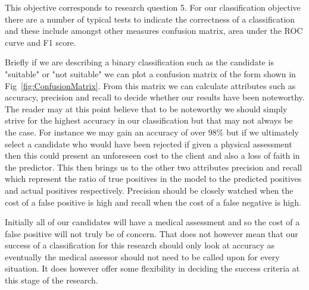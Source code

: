 This objective corresponds to research question 5. For our classification objective there are a number of typical tests to indicate the correctness of a classification and these include amongst other measures confusion matrix, area under the ROC curve and F1 score.




Briefly if we are describing a binary classification such as the candidate is "suitable" or "not suitable" we can plot a confusion matrix of the form shown in Fig~\ref{fig:ConfusionMatrix}. From this matrix we can calculate attributes such as accuracy, precision and recall to decide whether our results have been noteworthy. The reader may at this point believe that to be noteworthy we should simply strive for the highest accuracy in our classification but that may not always be the case. For instance we may gain an accuracy of over 98\% but if we ultimately select a candidate who would have been rejected if given a physical assessment then this could present an unforeseen cost to the client and also a loss of faith in the predictor. This then brings us to the other two attributes precision and recall which represent the ratio of true positives in the model to the predicted positives and actual positives respectively. Precision should be closely watched when the cost of a false positive is high and recall when the cost of a false negative is high.

Initially all of our candidates will have a medical assessment and so the cost of a false positive will not truly be of concern. That does not however mean that our success of a classification for this research should only look at accuracy as eventually the medical assessor should not need to be called upon for every situation. It does however offer some flexibility in deciding the success criteria at this stage of the research.

